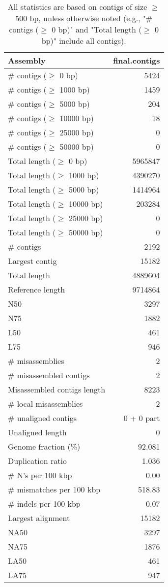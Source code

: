 \documentclass[12pt,a4paper]{article}
\begin{document}
\begin{table}[ht]
\begin{center}
\caption{All statistics are based on contigs of size $\geq$ 500 bp, unless otherwise noted (e.g., "\# contigs ($\geq$ 0 bp)" and "Total length ($\geq$ 0 bp)" include all contigs).}
\begin{tabular}{|l*{1}{|r}|}
\hline
Assembly & final.contigs \\ \hline
\# contigs ($\geq$ 0 bp) & 5424 \\ \hline
\# contigs ($\geq$ 1000 bp) & 1459 \\ \hline
\# contigs ($\geq$ 5000 bp) & 204 \\ \hline
\# contigs ($\geq$ 10000 bp) & 18 \\ \hline
\# contigs ($\geq$ 25000 bp) & 0 \\ \hline
\# contigs ($\geq$ 50000 bp) & 0 \\ \hline
Total length ($\geq$ 0 bp) & 5965847 \\ \hline
Total length ($\geq$ 1000 bp) & 4390270 \\ \hline
Total length ($\geq$ 5000 bp) & 1414964 \\ \hline
Total length ($\geq$ 10000 bp) & 203284 \\ \hline
Total length ($\geq$ 25000 bp) & 0 \\ \hline
Total length ($\geq$ 50000 bp) & 0 \\ \hline
\# contigs & 2192 \\ \hline
Largest contig & 15182 \\ \hline
Total length & 4889604 \\ \hline
Reference length & 9714864 \\ \hline
N50 & 3297 \\ \hline
N75 & 1882 \\ \hline
L50 & 461 \\ \hline
L75 & 946 \\ \hline
\# misassemblies & 2 \\ \hline
\# misassembled contigs & 2 \\ \hline
Misassembled contigs length & 8223 \\ \hline
\# local misassemblies & 2 \\ \hline
\# unaligned contigs & 0 + 0 part \\ \hline
Unaligned length & 0 \\ \hline
Genome fraction (\%) & 92.081 \\ \hline
Duplication ratio & 1.036 \\ \hline
\# N's per 100 kbp & 0.00 \\ \hline
\# mismatches per 100 kbp & 518.83 \\ \hline
\# indels per 100 kbp & 0.07 \\ \hline
Largest alignment & 15182 \\ \hline
NA50 & 3297 \\ \hline
NA75 & 1876 \\ \hline
LA50 & 461 \\ \hline
LA75 & 947 \\ \hline
\end{tabular}
\end{center}
\end{table}
\end{document}
